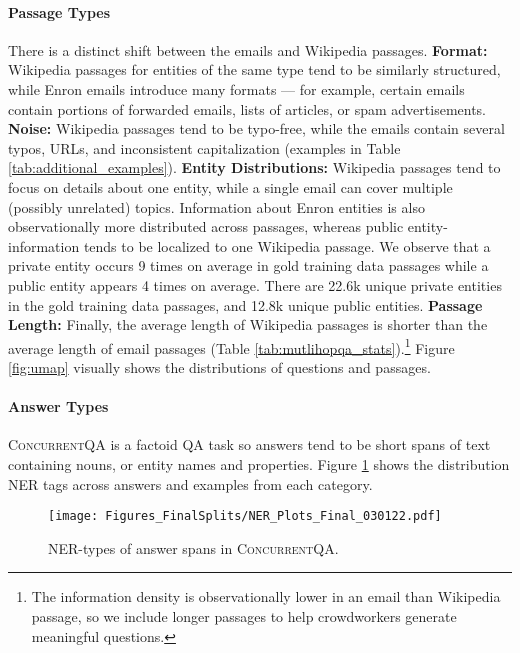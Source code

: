 \documentclass{article}
\newcommand{\datasetname}{\textsc{ConcurrentQA}\xspace}
\begin{document}
\paragraph{Passage Types} There is a distinct shift between the emails and Wikipedia passages. \textbf{Format:} Wikipedia passages for entities of the same type tend to be similarly structured, while Enron emails introduce many formats --- for example, certain emails contain portions of forwarded emails, lists of articles, or spam advertisements. \textbf{Noise:} Wikipedia passages tend to be typo-free, while the emails contain several typos, URLs,  and inconsistent capitalization (examples in Table \ref{tab:additional_examples}). \textbf{Entity Distributions:} Wikipedia passages tend to focus on details about one entity, while a single email can cover multiple (possibly unrelated) topics. Information about Enron entities is also observationally more distributed across passages, whereas public entity-information tends to be localized to one Wikipedia passage. We observe that a private entity occurs 9 times on average in gold training data passages while a public entity appears 4 times on average. There are 22.6k unique private entities in the gold training data passages, and 12.8k unique public entities. \textbf{Passage Length:} Finally, the average length of Wikipedia passages is shorter than the average length of email passages (Table \ref{tab:mutlihopqa_stats}).\footnote{The information density is observationally lower in an email than Wikipedia passage, so we include longer passages to help crowdworkers generate meaningful questions.} Figure \ref{fig:umap} visually shows the distributions of questions and passages.

\paragraph{Answer Types} \datasetname is a factoid QA task so answers tend to be short spans of text containing nouns, or entity names and properties. Figure \ref{fig:answer_analysis} shows the distribution NER tags across answers and examples from each category.

\begin{figure}
    \centering
    \texttt{[image: Figures\_FinalSplits/NER\_Plots\_Final\_030122.pdf]}
    \caption[width=0.9\linewidth]{NER-types of answer spans in \datasetname.}
    \label{fig:answer_analysis}
\end{figure}
\end{document}
